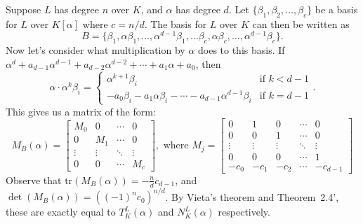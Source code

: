 \documentclass[11pt,letterpaper]{article}
\begin{document}
\begin{solution}
    Suppose $L$ has degree $n$ over $K$, and $\alpha$ has degree $d$. Let $\{\beta_1,\beta_2,\ldots,\beta_c\}$ be a basis for $L$ over $K[\alpha]$ where $c=n /d$. The basis for $L$ over $K$ can then be written as \[B=\{\beta_1, \alpha\beta_1, \ldots, \alpha^{d-1}\beta_1,\ldots\beta_c,\alpha\beta_c,\ldots,\alpha^{d-1}\beta_c\}.\]
    Now let's consider what multiplication by $\alpha$ does to this basis. If $\alpha^d+a_{d-1}\alpha^{d-1}+a_{d-2}\alpha^{d-2}+\cdots + a_1\alpha+a_0$, then
    \[
        \alpha\cdot \alpha^k\beta_i = \begin{cases}
            \alpha^{k+1}\beta_i&\textrm{if }k<d-1\\
            -a_0\beta_i-a_1\alpha\beta_i-\cdots-a_{d-1}\alpha^{d-1}\beta_i&\textrm{if }k=d-1
        \end{cases}
    .\] 
    This gives us a matrix of the form:
    \[
        M_B(\alpha)=\begin{bmatrix}
            M_0 & 0 &\cdots & 0\\
            0 & M_1 & \cdots & 0\\
            \vdots & \vdots & \ddots & \vdots\\
            0 & 0 & \cdots & M_c
        \end{bmatrix}, \textrm{ where }
        M_j=
        \begin{bmatrix}
            0 & 1 & 0 & \cdots & 0\\
            0 & 0 & 1 & \cdots & 0\\
            \vdots & \vdots & \vdots & \ddots &\vdots\\
            0 & 0 & 0 & \cdots & 1\\
            -c_0 & -c_1 & -c_2 & \cdots & -c_{d-1}
        \end{bmatrix}
    \] 
    Observe that $\textrm{tr}(M_B(\alpha))=-\frac{n}{d}c_{d-1}$, and $\det(M_B(\alpha))=\left((-1)^{n}c_0\right)^{n /d}$. By Vieta's theorem and Theorem~2.4', these are exactly equal to $T^L_K(\alpha)$ and $N^L_K(\alpha)$ respectively.  
\end{solution}
\end{document}
